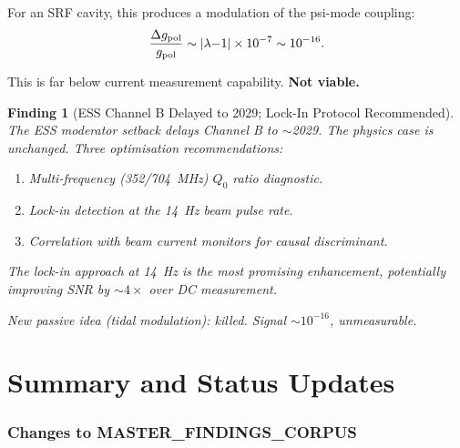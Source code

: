 \documentclass[11pt]{article}
\newtheorem{finding}{Finding}
\newcommand{\lambdaone}{|\lambda{-}1|}
\begin{document}
For an SRF cavity, this produces a modulation of the psi-mode coupling:
\begin{equation}
\frac{\Delta g_{\rm pol}}{g_{\rm pol}} \sim \lambdaone\times 10^{-7}
\sim 10^{-16}.
\end{equation}

This is far below current measurement capability. \textbf{Not viable.}

\begin{finding}[ESS Channel B Delayed to 2029; Lock-In Protocol Recommended]
\label{find:ESS}
The ESS moderator setback delays Channel B to $\sim$2029. The physics
case is unchanged. Three optimisation recommendations:
\begin{enumerate}[nosep]
\item Multi-frequency (352/704~MHz) $Q_0$ ratio diagnostic.
\item Lock-in detection at the 14~Hz beam pulse rate.
\item Correlation with beam current monitors for causal discriminant.
\end{enumerate}
The lock-in approach at 14~Hz is the most promising enhancement,
potentially improving SNR by $\sim 4\times$ over DC measurement.

New passive idea (tidal modulation): killed. Signal $\sim 10^{-16}$,
unmeasurable.
\end{finding}


\part{Summary and Status Updates}
\label{part:summary}

\section{Changes to MASTER\_FINDINGS\_CORPUS}
\end{document}
